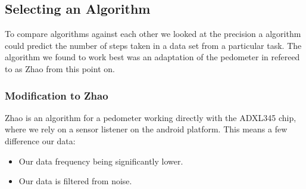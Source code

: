 \subsection{Selecting an Algorithm}
To compare algorithms against each other we looked at the precision a algorithm could predict the number of steps taken in a data set from a particular task. The algorithm we found to work best was an adaptation of the pedometer in \citet{zhao:pedometer} refereed to as Zhao from this point on.

\subsubsection{Modification to Zhao}
Zhao is an algorithm for a pedometer working directly with the ADXL345 chip, where we rely on a sensor listener on the android platform. This means a few difference our data:
\begin{itemize}
\item Our data frequency being significantly lower. 
\item Our data is filtered from noise.
\end{itemize} 

